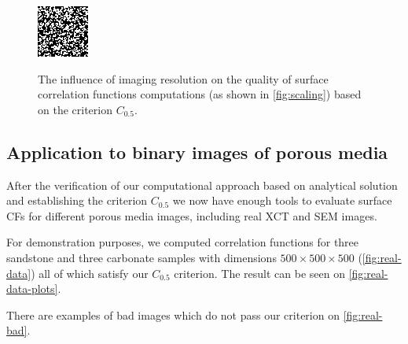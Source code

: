 \documentclass[reprint,amsmath,amssymb,aps,pre]{revtex4-1}
\begin{document}
\begin{figure}[t]
{    \includegraphics[width=0.475\linewidth]{images/disks-0015-5e-5-64.png}
    \label{fig:disks-64}}
  \caption[]{The influence of imaging resolution on the quality of surface
    correlation functions computations (as shown in \cref{fig:scaling}) based on
    the criterion $C_{0.5}$.}
  \label{fig:disks-res}
\end{figure}

\subsection{Application to binary images of porous media}
\label{sec:application}
After the verification of our computational approach based on analytical
solution and establishing the criterion $C_{0.5}$ we now have enough tools to
evaluate surface CFs for different porous media images, including real XCT and
SEM images.

For demonstration purposes, we computed correlation functions for three
sandstone and three carbonate samples with dimensions
$500 \times 500 \times 500$ (\cref{fig:real-data}) all of which satisfy our
$C_{0.5}$ criterion. The result can be seen on \cref{fig:real-data-plots}.

There are examples of bad images which do not pass our criterion on
\cref{fig:real-bad}.
\end{document}
